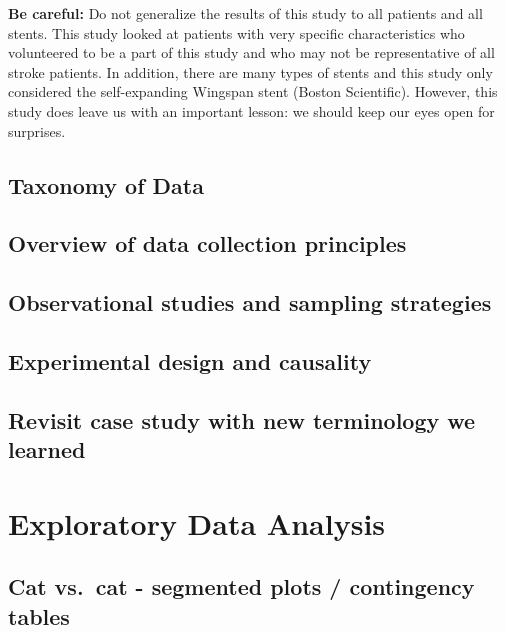 \documentclass[]{book}
\begin{document}
\textbf{Be careful:}
Do not generalize the results of this study to all patients and all stents.
This study looked at patients with very specific characteristics who volunteered to be a part of this study and who may not be representative of all stroke patients.
In addition, there are many types of stents and this study only considered the self-expanding Wingspan stent (Boston Scientific).
However, this study does leave us with an important lesson: we should keep our eyes open for surprises.

\hypertarget{taxonomy-of-data}{%
\section{Taxonomy of Data}\label{taxonomy-of-data}}

\hypertarget{overview-of-data-collection-principles}{%
\section{Overview of data collection principles}\label{overview-of-data-collection-principles}}

\hypertarget{observational-studies-and-sampling-strategies}{%
\section{Observational studies and sampling strategies}\label{observational-studies-and-sampling-strategies}}

\hypertarget{experimental-design-and-causality}{%
\section{Experimental design and causality}\label{experimental-design-and-causality}}

\hypertarget{revisit-case-study-with-new-terminology-we-learned}{%
\section{Revisit case study with new terminology we learned}\label{revisit-case-study-with-new-terminology-we-learned}}

\hypertarget{eda}{%
\chapter{Exploratory Data Analysis}\label{eda}}

\hypertarget{cat-vs.cat---segmented-plots-contingency-tables}{%
\section{Cat vs.~cat - segmented plots / contingency tables}\label{cat-vs.cat---segmented-plots-contingency-tables}}
\end{document}

